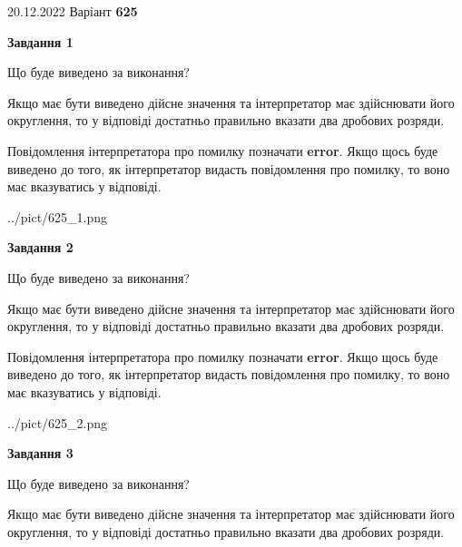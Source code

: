 \documentclass[12pt, ukrainian]{article}
\begin{document}
{20.12.2022 Варіант \No \textbf { 625 }\par}
{
\begin {Large}

{\begin {center}\textbf{Завдання 1}\end {center}}\par
Що буде виведено за виконання? \par

Якщо має бути виведено дійсне значення та інтерпретатор має здійснювати його округлення, 
то у відповіді достатньо правильно вказати два дробових розряди.

Повідомлення інтерпретатора про помилку позначати \textbf{error}.
Якщо щось буде виведено до того, як інтерпретатор видасть повідомлення про помилку, 
то воно має вказуватись у відповіді. \par

\begin{center}
	{../pict/625_1.png}
\end{center}
\newpage

{\begin {center}\textbf{Завдання 2}\end {center}}\par
Що буде виведено за виконання? \par

Якщо має бути виведено дійсне значення та інтерпретатор має здійснювати його округлення, 
то у відповіді достатньо правильно вказати два дробових розряди.

Повідомлення інтерпретатора про помилку позначати \textbf{error}.
Якщо щось буде виведено до того, як інтерпретатор видасть повідомлення про помилку, 
то воно має вказуватись у відповіді. \par

\begin{center}
	{../pict/625_2.png}
\end{center}
\newpage

{\begin {center}\textbf{Завдання 3}\end {center}}\par
Що буде виведено за виконання? \par

Якщо має бути виведено дійсне значення та інтерпретатор має здійснювати його округлення, 
то у відповіді достатньо правильно вказати два дробових розряди.


\end{Large}}
\end{document}
